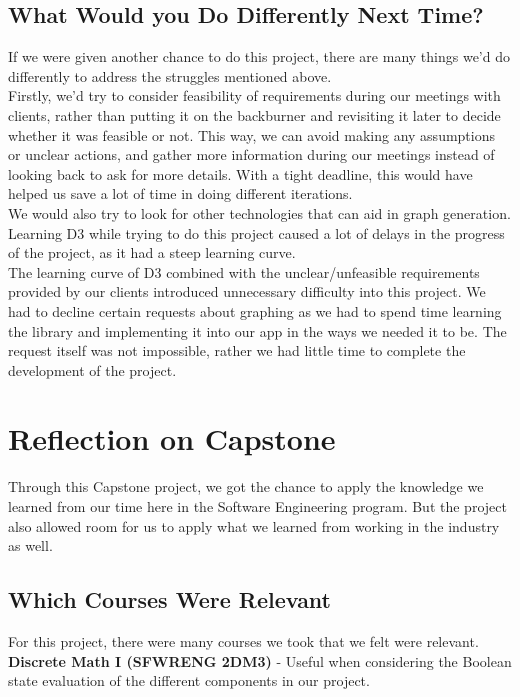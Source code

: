 \documentclass{article}
\begin{document}
\subsection{What Would you Do Differently Next Time?}

If we were given another chance to do this project, there are many things we'd
do differently to address the struggles mentioned above. \\

Firstly, we'd try to consider feasibility of requirements during our meetings
with clients, rather than putting it on the backburner and revisiting it later
to decide whether it was feasible or not. This way, we can avoid making any
assumptions or unclear actions, and gather more information during our meetings
instead of looking back to ask for more details. With a tight deadline, this
would have helped us save a lot of time in doing different iterations. \\

We would also try to look for other technologies that can aid in graph
generation. Learning D3 while trying to do this project caused a lot of delays
in the progress of the project, as it had a steep learning curve. \\

The learning curve of D3 combined with the unclear/unfeasible requirements
provided by our clients introduced unnecessary difficulty into this project. We
had to decline certain requests about graphing as we had to spend time learning
the library and implementing it into our app in the ways we needed it to be. The
request itself was not impossible, rather we had little time to complete the
development of the project.

\section{Reflection on Capstone}

Through this Capstone project, we got the chance to apply the knowledge we
learned from our time here in the Software Engineering program. But the project
also allowed room for us to apply what we learned from working in the industry
as well. 

\subsection{Which Courses Were Relevant}

For this project, there were many courses we took that we felt were relevant.
\textbf{Discrete Math I (SFWRENG 2DM3)} - Useful when considering the Boolean state
evaluation of the different components in our project. \\
\end{document}
